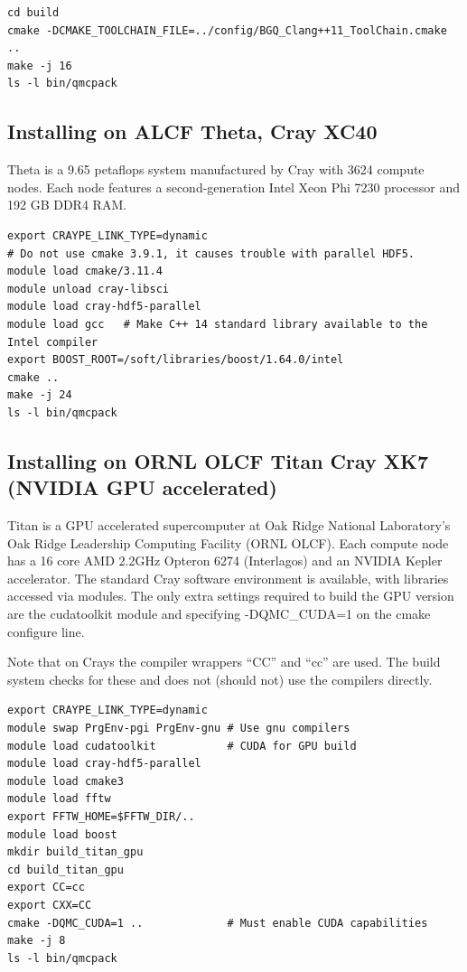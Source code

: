 \verbatimfont{\footnotesize}%
\begin{verbatim}
cd build
cmake -DCMAKE_TOOLCHAIN_FILE=../config/BGQ_Clang++11_ToolChain.cmake ..
make -j 16
ls -l bin/qmcpack
\end{verbatim}

\subsection{Installing on ALCF Theta, Cray XC40}
Theta is a 9.65 petaflops system manufactured by Cray with 3624 compute nodes.
Each node features a second-generation Intel Xeon Phi 7230 processor and 192 GB DDR4 RAM.

\verbatimfont{\footnotesize}%
\begin{verbatim}
export CRAYPE_LINK_TYPE=dynamic
# Do not use cmake 3.9.1, it causes trouble with parallel HDF5.
module load cmake/3.11.4
module unload cray-libsci
module load cray-hdf5-parallel
module load gcc   # Make C++ 14 standard library available to the Intel compiler
export BOOST_ROOT=/soft/libraries/boost/1.64.0/intel
cmake ..
make -j 24
ls -l bin/qmcpack
\end{verbatim}

\subsection{Installing on ORNL OLCF Titan Cray XK7 (NVIDIA GPU
  accelerated)}
\label{sec:titanbuildgpu}
Titan is a GPU accelerated supercomputer at Oak Ridge National
Laboratory's  Oak Ridge Leadership Computing Facility  (ORNL OLCF). Each
compute node has a 16 core AMD 2.2GHz Opteron 6274 (Interlagos) and an
NVIDIA Kepler accelerator. The standard Cray software environment is
available, with libraries accessed via modules. The only extra
settings required to build the GPU version are the cudatoolkit module
and specifying -DQMC\_CUDA=1 on the cmake configure line.

Note that on Crays the compiler wrappers ``CC'' and ``cc'' are
used. The build system checks for these and does not (should not) use
the compilers directly.

\verbatimfont{\footnotesize}%
\begin{verbatim}
export CRAYPE_LINK_TYPE=dynamic
module swap PrgEnv-pgi PrgEnv-gnu # Use gnu compilers
module load cudatoolkit           # CUDA for GPU build
module load cray-hdf5-parallel
module load cmake3
module load fftw
export FFTW_HOME=$FFTW_DIR/..
module load boost
mkdir build_titan_gpu
cd build_titan_gpu
export CC=cc
export CXX=CC
cmake -DQMC_CUDA=1 ..             # Must enable CUDA capabilities
make -j 8
ls -l bin/qmcpack
\end{verbatim}

